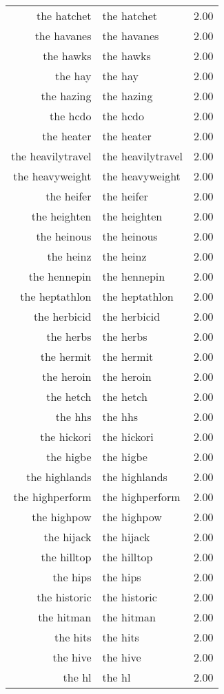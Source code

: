 \begin{table}[ht]
\begin{tabular}{rlr}
  the hatchet & the hatchet & 2.00 \\ 
  the havanes & the havanes & 2.00 \\ 
  the hawks & the hawks & 2.00 \\ 
  the hay & the hay & 2.00 \\ 
  the hazing & the hazing & 2.00 \\ 
  the hcdo & the hcdo & 2.00 \\ 
  the heater & the heater & 2.00 \\ 
  the heavilytravel & the heavilytravel & 2.00 \\ 
  the heavyweight & the heavyweight & 2.00 \\ 
  the heifer & the heifer & 2.00 \\ 
  the heighten & the heighten & 2.00 \\ 
  the heinous & the heinous & 2.00 \\ 
  the heinz & the heinz & 2.00 \\ 
  the hennepin & the hennepin & 2.00 \\ 
  the heptathlon & the heptathlon & 2.00 \\ 
  the herbicid & the herbicid & 2.00 \\ 
  the herbs & the herbs & 2.00 \\ 
  the hermit & the hermit & 2.00 \\ 
  the heroin & the heroin & 2.00 \\ 
  the hetch & the hetch & 2.00 \\ 
  the hhs & the hhs & 2.00 \\ 
  the hickori & the hickori & 2.00 \\ 
  the higbe & the higbe & 2.00 \\ 
  the highlands & the highlands & 2.00 \\ 
  the highperform & the highperform & 2.00 \\ 
  the highpow & the highpow & 2.00 \\ 
  the hijack & the hijack & 2.00 \\ 
  the hilltop & the hilltop & 2.00 \\ 
  the hips & the hips & 2.00 \\ 
  the historic & the historic & 2.00 \\ 
  the hitman & the hitman & 2.00 \\ 
  the hits & the hits & 2.00 \\ 
  the hive & the hive & 2.00 \\ 
  the hl & the hl & 2.00 \\ 

\end{tabular}
\end{table}
